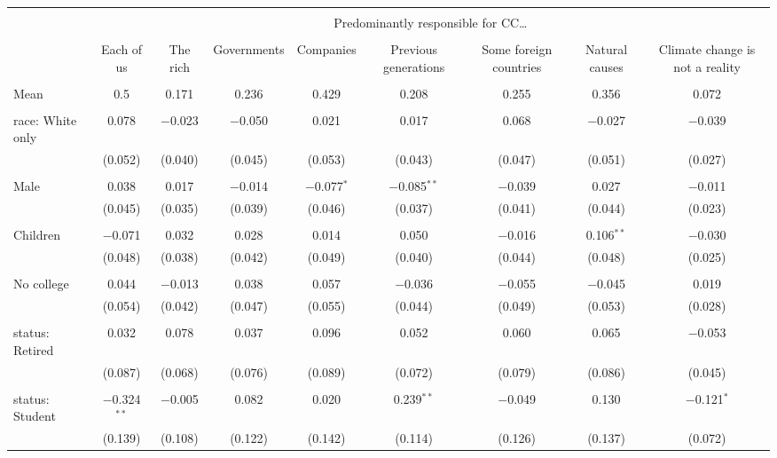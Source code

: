 
\begin{tabular}{@{\extracolsep{5pt}}lcccccccc} 
\\[-1.8ex]\hline 
\hline \\[-1.8ex] 
 & \multicolumn{8}{c}{Predominantly responsible for CC…} \\ 
\cline{2-9} 
\\[-1.8ex] & Each of us & The rich & Governments & Companies & Previous generations & Some foreign countries & Natural causes & Climate change is not a reality \\ 
\hline \\[-1.8ex] 
 Mean & 0.5 & 0.171 & 0.236 & 0.429 & 0.208 & 0.255 & 0.356 & 0.072  \\ \hline \\[-1.8ex] race: White only & 0.078 & $-$0.023 & $-$0.050 & 0.021 & 0.017 & 0.068 & $-$0.027 & $-$0.039 \\ 
  & (0.052) & (0.040) & (0.045) & (0.053) & (0.043) & (0.047) & (0.051) & (0.027) \\ 
  & & & & & & & & \\ 
 Male & 0.038 & 0.017 & $-$0.014 & $-$0.077$^{*}$ & $-$0.085$^{**}$ & $-$0.039 & 0.027 & $-$0.011 \\ 
  & (0.045) & (0.035) & (0.039) & (0.046) & (0.037) & (0.041) & (0.044) & (0.023) \\ 
  & & & & & & & & \\ 
 Children & $-$0.071 & 0.032 & 0.028 & 0.014 & 0.050 & $-$0.016 & 0.106$^{**}$ & $-$0.030 \\ 
  & (0.048) & (0.038) & (0.042) & (0.049) & (0.040) & (0.044) & (0.048) & (0.025) \\ 
  & & & & & & & & \\ 
 No college & 0.044 & $-$0.013 & 0.038 & 0.057 & $-$0.036 & $-$0.055 & $-$0.045 & 0.019 \\ 
  & (0.054) & (0.042) & (0.047) & (0.055) & (0.044) & (0.049) & (0.053) & (0.028) \\ 
  & & & & & & & & \\ 
 status: Retired & 0.032 & 0.078 & 0.037 & 0.096 & 0.052 & 0.060 & 0.065 & $-$0.053 \\ 
  & (0.087) & (0.068) & (0.076) & (0.089) & (0.072) & (0.079) & (0.086) & (0.045) \\ 
  & & & & & & & & \\ 
 status: Student & $-$0.324$^{**}$ & $-$0.005 & 0.082 & 0.020 & 0.239$^{**}$ & $-$0.049 & 0.130 & $-$0.121$^{*}$ \\ 
  & (0.139) & (0.108) & (0.122) & (0.142) & (0.114) & (0.126) & (0.137) & (0.072) \\ 

\end{tabular}
